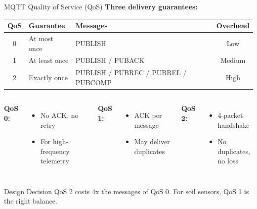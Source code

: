 \documentclass[aspectratio=169,11pt]{beamer}
\begin{document}
\begin{frame}{MQTT Quality of Service (QoS)}
    \textbf{Three delivery guarantees:}
    
    \vspace{0.15cm}
    \begin{center}
    \footnotesize
    \begin{tabular}{clp{4.5cm}c}
        \toprule
        \textbf{QoS} & \textbf{Guarantee} & \textbf{Messages} & \textbf{Overhead} \\
        \midrule
        0 & At most once & PUBLISH & Low \\
        1 & At least once & PUBLISH / PUBACK & Medium \\
        2 & Exactly once & PUBLISH / PUBREC / PUBREL / PUBCOMP & High \\
        \bottomrule
    \end{tabular}
    \normalsize
    \end{center}
    
    \vspace{0.1cm}
    \begin{columns}
        \textbf{QoS 0:}
        \begin{itemize}
            \item No ACK, no retry
            \item For high-frequency telemetry
        \end{itemize}
        
        \textbf{QoS 1:}
        \begin{itemize}
            \item ACK per message
            \item May deliver duplicates
        \end{itemize}
        
        \textbf{QoS 2:}
        \begin{itemize}
            \item 4-packet handshake
            \item No duplicates, no loss
        \end{itemize}
    \end{columns}
    
    \begin{alertblock}{Design Decision}
        QoS 2 costs 4x the messages of QoS 0. For soil sensors, QoS 1 is the right balance.
    \end{alertblock}
\end{frame}
\end{document}

